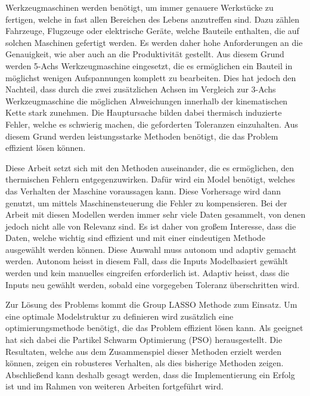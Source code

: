 Werkzeugmaschinen werden benötigt, um immer genauere Werkstücke zu fertigen, welche in fast allen Bereichen des Lebens anzutreffen sind. Dazu zählen Fahrzeuge, Flugzeuge oder elektrische Geräte, welche Bauteile enthalten, die auf solchen Maschinen gefertigt werden. Es werden daher hohe Anforderungen an die Genauigkeit, wie aber auch an die Produktivität gestellt. Aus diesem Grund werden 5-Achs Werkzeugmaschine eingesetzt, die es ermöglichen ein Bauteil in möglichst wenigen Aufspannungen komplett zu bearbeiten. Dies hat jedoch den Nachteil, dass durch die zwei zusätzlichen Achsen im Vergleich zur 3-Achs Werkzeugmaschine die möglichen Abweichungen innerhalb der kinematischen Kette stark zunehmen. Die Hauptursache bilden dabei thermisch induzierte Fehler, welche es schwierig machen, die geforderten Toleranzen einzuhalten.  Aus diesem Grund werden leistungsstarke Methoden benötigt, die das Problem effizient lösen können.

Diese Arbeit setzt sich mit den Methoden auseinander, die es ermöglichen, den thermischen Fehlern entgegenzuwirken. Dafür wird ein Model benötigt, welches das Verhalten der Maschine voraussagen kann. Diese Vorhersage wird dann genutzt, um mittels Maschinensteuerung die Fehler zu kompensieren. Bei der Arbeit mit diesen Modellen werden immer sehr viele Daten gesammelt, von denen jedoch nicht alle von Relevanz sind. Es ist daher von großem Interesse, dass die Daten, welche wichtig sind effizient und mit einer eindeutigen Methode ausgewählt werden können. Diese Auswahl muss autonom und adaptiv gemacht werden. Autonom heisst in diesem Fall, dass die Inputs Modelbasiert gewählt werden und kein manuelles eingreifen erforderlich ist. Adaptiv heisst, dass die Inputs neu gewählt werden, sobald eine vorgegeben Toleranz überschritten wird. 

Zur Lösung des Problems kommt die Group LASSO Methode zum Einsatz. Um eine optimale Modelstruktur zu definieren wird zusätzlich eine optimierungsmethode benötigt, die das Problem effizient lösen kann. Als geeignet hat sich dabei die Partikel Schwarm Optimierung (PSO) herausgestellt. Die Resultaten, welche aus dem Zusammenspiel dieser Methoden erzielt werden können, zeigen ein robusteres Verhalten, als dies bisherige Methoden zeigen. Abschließend kann deshalb gesagt werden, dass die Implementierung ein Erfolg ist und im Rahmen von weiteren Arbeiten fortgeführt wird.





%
